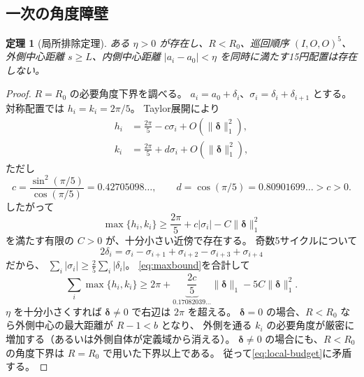 \documentclass[11pt,a4paper]{article}
\theoremstyle{JPthm}
\newtheorem{theorem}{定理}[section]
\theoremstyle{definition}
\newcommand{\Rc}{R_{0}}
\begin{document}
\subsection{一次の角度障壁}
\begin{theorem}[局所排除定理]\label{thm:local}
ある $\eta>0$ が存在し、$R<\Rc$、巡回順序 $(I,O,O)^5$、
外側中心距離 $s\ge L$、内側中心距離 $|a_i-a_0|<\eta$ を同時に満たす15円配置は存在しない。
\end{theorem}
\begin{proof}
$R=\Rc$ の必要角度下界を調べる。
$a_i=a_0+\delta_i$、$\sigma_i=\delta_i+\delta_{i+1}$ とする。
対称配置では $h_i=k_i=2\pi/5$。
Taylor展開により
\begin{align}
 h_i&=\frac{2\pi}{5}-c\sigma_i+O(\lVert\boldsymbol\delta\rVert_1^2),\\
 k_i&=\frac{2\pi}{5}+d\sigma_i+O(\lVert\boldsymbol\delta\rVert_1^2),
\end{align}
ただし
\[
 c=\frac{\sin^2(\pi/5)}{\cos(\pi/5)}=0.42705098\ldots,
 \qquad d=\cos(\pi/5)=0.80901699\ldots>c>0.
\]
したがって
\begin{equation}\label{eq:maxbound}
 \max\{h_i,k_i\}\ge\frac{2\pi}{5}+c|\sigma_i|-C\lVert\boldsymbol\delta\rVert_1^2
\end{equation}
を満たす有限の $C>0$ が、十分小さい近傍で存在する。
奇数5サイクルについて
\[
2\delta_i=\sigma_i-\sigma_{i+1}+\sigma_{i+2}-\sigma_{i+3}+\sigma_{i+4}
\]
だから、
$\sum_i|\sigma_i|\ge\frac25\sum_i|\delta_i|$。
\eqref{eq:maxbound}を合計して
\begin{equation}\label{eq:sharp-local}
\sum_i\max\{h_i,k_i\}
\ge 2\pi+\underbrace{\frac{2c}{5}}_{0.17082039\ldots}
\lVert\boldsymbol\delta\rVert_1-5C\lVert\boldsymbol\delta\rVert_1^2.
\end{equation}
$\eta$ を十分小さくすれば $\boldsymbol\delta\ne0$ で右辺は $2\pi$ を超える。
$\boldsymbol\delta=0$ の場合、$R<\Rc$ なら外側中心の最大距離が $R-1<b$ となり、
外側を通る $k_i$ の必要角度が厳密に増加する（あるいは外側自体が定義域から消える）。
$\boldsymbol\delta\ne0$ の場合にも、$R<\Rc$ の角度下界は $R=\Rc$ で用いた下界以上である。
従って\eqref{eq:local-budget}に矛盾する。
\end{proof}
\end{document}
